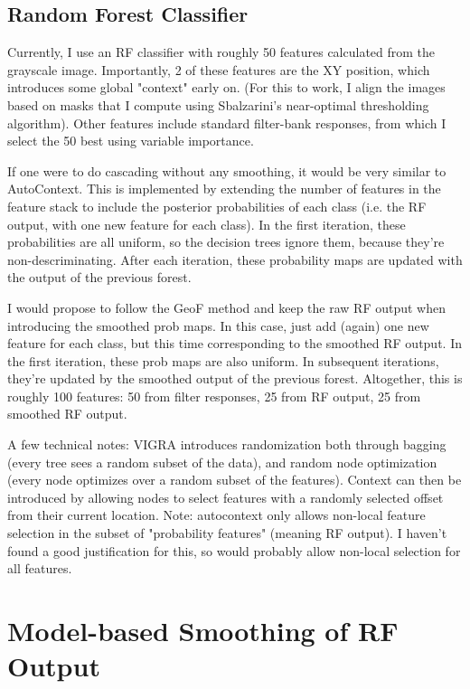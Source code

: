 \documentclass[10pt,twocolumn,letterpaper]{article}
\begin{document}
\subsection{Random Forest Classifier}

Currently, I use an RF classifier with roughly 50 features calculated from the grayscale image.  Importantly, 2 of these features are the XY position, which introduces some global "context" early on.  (For this to work, I align the images based on masks that I compute using Sbalzarini's near-optimal thresholding algorithm).  Other features include standard filter-bank responses, from which I select the 50 best using variable importance.

If one were to do cascading without any smoothing, it would be very similar to AutoContext.  This is implemented by extending the number of features in the feature stack to include the posterior probabilities of each class (i.e. the RF output, with one new feature for each class).  In the first iteration, these probabilities are all uniform, so the decision trees ignore them, because they're non-descriminating.  After each iteration, these probability maps are updated with the output of the previous forest.

I would propose to follow the GeoF method and keep the raw RF output when introducing the smoothed prob maps.  In this case, just add (again) one new feature for each class, but this time corresponding to the smoothed RF output.  In the first iteration, these prob maps are also uniform.  In subsequent iterations, they're updated by the smoothed output of the previous forest.  Altogether, this is roughly 100 features: 50 from filter responses, 25 from RF output, 25 from smoothed RF output.

A few technical notes: VIGRA introduces randomization both through bagging (every tree sees a random subset of the data), and random node optimization (every node optimizes over a random subset of the features).  Context can then be introduced by allowing nodes to select features with a randomly selected offset from their current location.  Note: autocontext only allows non-local feature selection in the subset of "probability features" (meaning RF output).  I haven't found a good justification for this, so would probably allow non-local selection for all features.

\section{Model-based Smoothing of RF Output}
\end{document}

